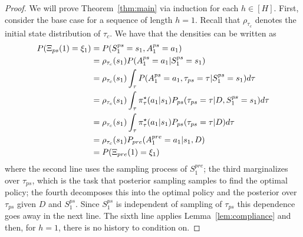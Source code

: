 \begin{proof}
We will prove Theorem~\ref{thm:main} via induction for each $h \in [H]$. First, consider the base case for a sequence of length $h = 1$. Recall that $\rho_{\tau_c}$ denotes the initial state distribution of $\tau_c$. We have that the densities can be written as
\begin{align}
    P(\Xi_{ps}(1) = \xi_1) &  = P(S^{ps}_1  = s_1, A^{ps}_1 = a_1) \\
    & = \rho_{\tau_c}(s_1) P(A^{ps}_1 = a_1 | S^{ps}_1 = s_1) \\
    & = \rho_{\tau_c}(s_1) \int_{\tau} P(A^{ps}_1 = a_1, \tau_{ps} = \tau | S^{ps}_1 = s_1) d\tau \\
    & = \rho_{\tau_c}(s_1) \int_{\tau} \pi^{\star}_\tau(a_1 | s_1)  P_{ps} (\tau_{ps} = \tau | D, S^{ps}_1 = s_1) d\tau \\
    & = \rho_{\tau_c}(s_1) \int_{\tau} \pi^{\star}_\tau(a_1 | s_1)  P_{ps} (\tau_{ps} = \tau | D) d\tau \\
    & = \rho_{\tau_c}(s_1) P_{pre}( A^{pre}_1 = a_1 | s_1, D) \\
    & = P(\Xi_{pre}(1) = \xi_1)
\end{align}
where the second line uses the sampling process of $S^{pre}_1$; the third marginalizes over $\tau_{ps}$, which is the task that posterior sampling samples to find the optimal policy; the fourth decomposes this into the optimal policy and the posterior over $\tau_{ps}$ given $D$ and $S^{ps}_1$. Since $S^{ps}_1$ is independent of sampling of $\tau_{ps}$ this dependence goes away in the next line. The sixth line applies Lemma~\ref{lem:compliance} and then, for $h = 1$, there is no history to condition on.


\end{proof}
